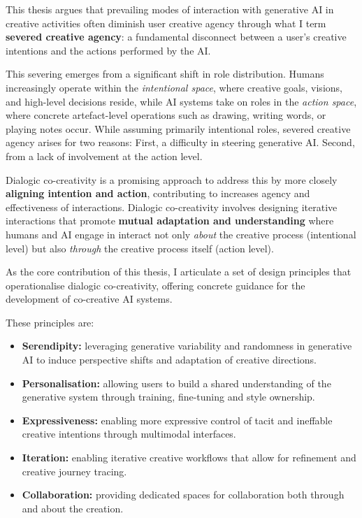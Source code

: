 This thesis argues that prevailing modes of interaction with generative AI in creative activities often diminish user creative agency through what I term \textbf{severed creative agency}: a fundamental disconnect between a user’s creative intentions and the actions performed by the AI. 

This severing emerges from a significant shift in role distribution. Humans increasingly operate within the \textit{intentional space}, where creative goals, visions, and high-level decisions reside, while AI systems take on roles in the \textit{action space}, where concrete artefact-level operations such as drawing, writing words, or playing notes occur. While assuming primarily intentional roles, severed creative agency arises for two reasons: First, a difficulty in steering generative AI. Second, from a lack of involvement at the action level.

Dialogic co-creativity is a promising approach to address this by more closely \textbf{aligning intention and action}, contributing to increases agency and effectiveness of interactions. Dialogic co-creativity involves designing iterative interactions that promote \textbf{mutual adaptation and understanding} where humans and AI engage in interact not only \textit{about} the creative process (intentional level) but also \textit{through} the creative process itself (action level). 

As the core contribution of this thesis, I articulate a set of design principles that operationalise dialogic co-creativity, offering concrete guidance for the development of co-creative AI systems. 

These principles are: 

\begin{tcolorbox}[colback=gray!5, colframe=gray!60!black, title=\textbf{Design Principles for Human–AI Co-Creativity}, sharp corners=south, fonttitle=\bfseries]
\begin{itemize}
    \item \textbf{Serendipity:} leveraging generative variability and randomness in generative AI to induce perspective shifts and adaptation of creative directions.
    \item \textbf{Personalisation:} allowing users to build a shared understanding of the generative system through training, fine-tuning and style ownership.
    \item \textbf{Expressiveness:} enabling more expressive control of tacit and ineffable creative intentions through multimodal interfaces.
    \item \textbf{Iteration:} enabling iterative creative workflows that allow for refinement and creative journey tracing.
    \item \textbf{Collaboration:} providing dedicated spaces for collaboration both through and about the creation.
\end{itemize}
\end{tcolorbox}

